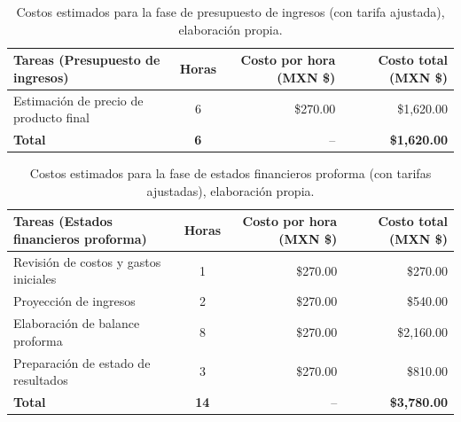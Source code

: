 \begin{table}[H]
	\centering
	\renewcommand{\arraystretch}{1.6}
	\setlength{\tabcolsep}{10pt}
	\Huge
	\begin{adjustbox}{max width=\textwidth}
		\begin{tabular}{|p{9.5cm}|c|r|r|}
			\hline
			\textbf{Tareas (Presupuesto de ingresos)} & \textbf{Horas} & \textbf{Costo por hora (MXN \$)} & \textbf{Costo total (MXN \$)} \\ \hline
			Estimación de precio de producto final & 6 & \$270.00 & \$1,620.00 \\ \hline
			\textbf{Total} & \textbf{6} & -- & \textbf{\$1,620.00} \\ \hline
		\end{tabular}
	\end{adjustbox}
	\caption[Costos estimados para la fase de presupuesto de ingresos (con tarifa ajustada)]{Costos estimados para la fase de presupuesto de ingresos (con tarifa ajustada), elaboración propia.} 
	\label{tab:costos_presupuesto_ingresos_s}
\end{table}

\begin{table}[H]
	\centering
	\renewcommand{\arraystretch}{1.6}
	\setlength{\tabcolsep}{10pt}
	\Huge
	\begin{adjustbox}{max width=\textwidth}
		\begin{tabular}{|p{9.5cm}|c|r|r|}
			\hline
			\textbf{Tareas (Estados financieros proforma)} & \textbf{Horas} & \textbf{Costo por hora (MXN \$)} & \textbf{Costo total (MXN \$)} \\ \hline
			Revisión de costos y gastos iniciales & 1 & \$270.00 & \$270.00 \\ \hline
			Proyección de ingresos & 2 & \$270.00 & \$540.00 \\ \hline
			Elaboración de balance proforma & 8 & \$270.00 & \$2,160.00 \\ \hline
			Preparación de estado de resultados & 3 & \$270.00 & \$810.00 \\ \hline
			\textbf{Total} & \textbf{14} & -- & \textbf{\$3,780.00} \\ \hline
		\end{tabular}
	\end{adjustbox}
	\caption[Costos estimados para la fase de estados financieros proforma (con tarifas ajustadas)]{Costos estimados para la fase de estados financieros proforma (con tarifas ajustadas), elaboración propia.} 
	\label{tab:costos_financieros_proforma}
\end{table}

